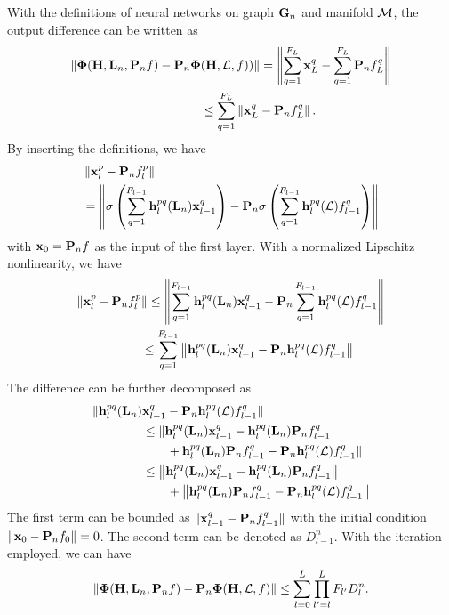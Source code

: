 With the definitions of neural networks on graph ${\mathbf G}_n$ and manifold ${\mathcal M}$, the output difference can be written as 
 \begin{align}
    \nonumber \|\bm\Phi({\mathbf H},{\mathbf L}_n,{\mathbf P}_nf)-{\mathbf P}_n \bm\Phi&({\mathbf H},{\mathcal L}, f))\| = \left\| \sum_{q=1}^{F_L}{\mathbf x}_L^q-\sum_{q=1}^{F_L}{\mathbf P}_n f_L^q \right\|\\
     & \leq \sum_{q=1}^{F_L} \left\| {\mathbf x}_L^q- {\mathbf P}_n f_L^q \right\|.
 \end{align}
 By inserting the definitions, we have 
 \begin{align}
   \nonumber  &\left\| {\mathbf x}_l^p- {\mathbf P}_n f_l^p \right\|\\
     &=\left\| \sigma\left(\sum_{q=1}^{F_{l-1}} {\mathbf h}_l^{pq}({\mathbf L}_n) {\mathbf x}_{l-1}^q \right) -{\mathbf P}_n \sigma\left(\sum_{q=1}^{F_{l-1}} {\mathbf h}_l^{pq}({\mathcal L}) f_{l-1}^q\right) \right\|
 \end{align}
 with ${\mathbf x}_0={\mathbf P}_n f$ as the input of the first layer. With a normalized Lipschitz nonlinearity, we have
  \begin{align}
    \| {\mathbf x}_l^p - {\mathbf P}_n f_l^p & \| \leq \left\|  \sum_{q=1}^{F_{l-1}} {\mathbf h}_l^{pq}({\mathbf L}_n) {\mathbf x}_{l-1}^q    - {\mathbf P}_n \sum_{q=1}^{F_{l-1}} {\mathbf h}_l^{pq}({\mathcal L})  f_{l-1}^q\right\|\\
    & \leq \sum_{q=1}^{F_{l-1}} \left\|    {\mathbf h}_l^{pq}({\mathbf L}_n) {\mathbf x}_{l-1}^q    - {\mathbf P}_n   {\mathbf h}_l^{pq}({\mathcal L})  f_{l-1}^q\right\|
 \end{align}
 The difference can be further decomposed as
\begin{align}
   \nonumber   \|    {\mathbf h}_l^{pq}({\mathbf L}_n) & {\mathbf x}_{l-1}^q    - {\mathbf P}_n   {\mathbf h}_l^{pq}({\mathcal L})  f_{l-1}^q \| 
   \\ \nonumber&\leq \|
{\mathbf h}_l^{pq}({\mathbf L}_n) {\mathbf x}_{l-1}^q  - {\mathbf h}_l^{pq}({\mathbf L}_n) {\mathbf P}_n f_{l-1}^q \\ &\qquad +{\mathbf h}_l^{pq}({\mathbf L}_n) {\mathbf P}_n f_{l-1}^q  - {\mathbf P}_n   {\mathbf h}_l^{pq}({\mathcal L})  f_{l-1}^q
    \|\\\nonumber
   & \leq \left\|
    {\mathbf h}_l^{pq}({\mathbf L}_n) {\mathbf x}_{l-1}^q  - {\mathbf h}_l^{pq}({\mathbf L}_n) {\mathbf P}_n f_{l-1}^q
    \right\|
  \\ &\qquad +
    \left\|
    {\mathbf h}_l^{pq}({\mathbf L}_n) {\mathbf P}_n f_{l-1}^q  - {\mathbf P}_n   {\mathbf h}_l^{pq}({\mathcal L})  f_{l-1}^q
    \right\|
\end{align}
The first term can be bounded as $\| {\mathbf x}_{l-1}^q - {\mathbf P}_nf_{l-1}^q\|$ with the initial condition $\|{\mathbf x}_0 - {\mathbf P}_n f_0\|=0$. The second term can be denoted as $D_{l-1}^n$. With the iteration employed, we can have
\begin{align}
 \nonumber \|\bm\Phi({\mathbf H},{\mathbf L}_n,{\mathbf P}_n f) - {\mathbf P}_n \bm\Phi({\mathbf H},{\mathcal L},f)\| 
 \leq
 \sum_{l=0}^L \prod\limits_{l'=l}^L F_{l'} D_l^n.
 \end{align}
